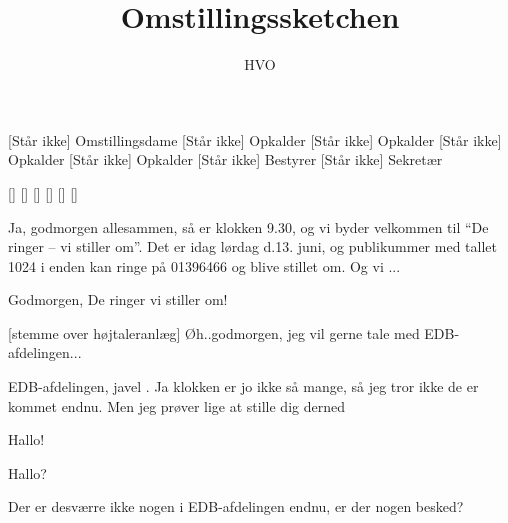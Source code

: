 \documentclass[a4paper,11pt]{article}
\title{Omstillingssketchen}
\author{HVO}
\begin{document}
\maketitle

\begin{roles}
[Står ikke] Omstillingsdame
[Står ikke] Opkalder
[Står ikke] Opkalder
[Står ikke] Opkalder
[Står ikke] Opkalder
[Står ikke] Bestyrer
[Står ikke] Sekretær
\end{roles}

\begin{props}
[]
[]
[]
[]
[]
[]
\end{props}


\begin{sketch}


 

Ja, godmorgen allesammen, så er klokken 9.30, og vi byder velkommen til ``De
ringer -- vi stiller om''. Det er idag lørdag d.13. juni, og publikummer med
tallet 1024 i enden kan ringe på 01396466 og blive stillet om. Og vi
... 


  Godmorgen, De ringer vi stiller om!

[stemme over højtaleranlæg] Øh..godmorgen, jeg vil gerne tale med
EDB-afdelingen...

 EDB-afdelingen, javel . Ja klokken er jo ikke så
mange, så jeg tror ikke de er kommet endnu. Men jeg prøver lige at stille dig
derned 

   Hallo!

 Hallo?

 Der er desværre ikke nogen i EDB-afdelingen endnu, er der nogen
besked?


\end{sketch}
\end{document}
